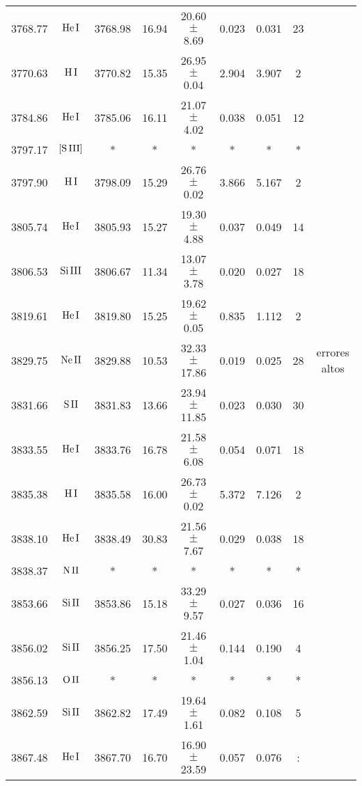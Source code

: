 \documentclass{article}
\begin{document}
\begin{table*}
\begin{adjustbox}{width=\textwidth}
\begin{tabular}{ccccccccc}
3768.77 & $\mbox{He}\thinspace \mbox{I}$ & 3768.98 & 16.94 & 20.60 $\pm$ 8.69 & 0.023 & 0.031 & 23 &  \\
3770.63 & $\mbox{H}\thinspace \mbox{I}$ & 3770.82 & 15.35 & 26.95 $\pm$ 0.04 & 2.904 & 3.907 & 2 &  \\
3784.86 & $\mbox{He}\thinspace \mbox{I}$ & 3785.06 & 16.11 & 21.07 $\pm$ 4.02 & 0.038 & 0.051 & 12 &  \\
3797.17 & $\mbox{[S}\thinspace \mbox{III]}$ & * & * & * & * & * & * &  \\
3797.90 & $\mbox{H}\thinspace \mbox{I}$ & 3798.09 & 15.29 & 26.76 $\pm$ 0.02 & 3.866 & 5.167 & 2 &  \\
3805.74 & $\mbox{He}\thinspace \mbox{I}$ & 3805.93 & 15.27 & 19.30 $\pm$ 4.88 & 0.037 & 0.049 & 14 &  \\
3806.53 & $\mbox{Si}\thinspace \mbox{III}$ & 3806.67 & 11.34 & 13.07 $\pm$ 3.78 & 0.020 & 0.027 & 18 &  \\
3819.61 & $\mbox{He}\thinspace \mbox{I}$ & 3819.80 & 15.25 & 19.62 $\pm$ 0.05 & 0.835 & 1.112 & 2 &  \\
3829.75 & $\mbox{Ne}\thinspace \mbox{II}$ & 3829.88 & 10.53 & 32.33 $\pm$ 17.86 & 0.019 & 0.025 & 28 &  errores altos \\
3831.66 & $\mbox{S}\thinspace \mbox{II}$ & 3831.83 & 13.66 & 23.94 $\pm$ 11.85 & 0.023 & 0.030 & 30 &  \\
3833.55 & $\mbox{He}\thinspace \mbox{I}$ & 3833.76 & 16.78 & 21.58 $\pm$ 6.08 & 0.054 & 0.071 & 18 &  \\
3835.38 & $\mbox{H}\thinspace \mbox{I}$ & 3835.58 & 16.00 & 26.73 $\pm$ 0.02 & 5.372 & 7.126 & 2 &  \\
3838.10 & $\mbox{He}\thinspace \mbox{I}$ & 3838.49 & 30.83 & 21.56 $\pm$ 7.67 & 0.029 & 0.038 & 18 &  \\
3838.37 & $\mbox{N}\thinspace \mbox{II}$ & * & * & * & * & * & * &  \\
3853.66 & $\mbox{Si}\thinspace \mbox{II}$ & 3853.86 & 15.18 & 33.29 $\pm$ 9.57 & 0.027 & 0.036 & 16 &  \\
3856.02 & $\mbox{Si}\thinspace \mbox{II}$ & 3856.25 & 17.50 & 21.46 $\pm$ 1.04 & 0.144 & 0.190 & 4 &  \\
3856.13 & $\mbox{O}\thinspace \mbox{II}$ & * & * & * & * & * & * &  \\
3862.59 & $\mbox{Si}\thinspace \mbox{II}$ & 3862.82 & 17.49 & 19.64 $\pm$ 1.61 & 0.082 & 0.108 & 5 &  \\
3867.48 & $\mbox{He}\thinspace \mbox{I}$ & 3867.70 & 16.70 & 16.90 $\pm$ 23.59 & 0.057 & 0.076 & : &  \\

\end{tabular}
\end{adjustbox}
\end{table*}
\end{document}
